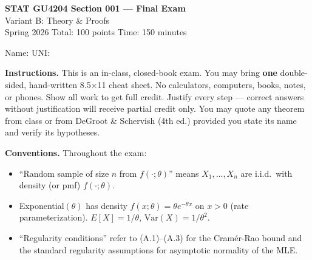 \documentclass[11pt]{article}
\begin{document}
\begin{center}
{\LARGE\bfseries STAT GU4204 Section 001 --- Final Exam}\\[4pt]
{\large Variant B: Theory \& Proofs}\\[6pt]
{\large Spring 2026 \hspace{1.5cm} Total: 100 points \hspace{1.5cm} Time: 150 minutes}\\[4pt]
\end{center}

\medskip

Name: \underline{\hspace{3in}} \hspace{1cm} UNI: \underline{\hspace{1.5in}}

\medskip

\textbf{Instructions.} This is an in-class, closed-book exam. You may bring \textbf{one} double-sided, hand-written 8.5$\times$11 cheat sheet. No calculators, computers, books, notes, or phones. Show all work to get full credit. Justify every step --- correct answers without justification will receive partial credit only. You may quote any theorem from class or from DeGroot \& Schervish (4th ed.) provided you state its name and verify its hypotheses.

\medskip

\textbf{Conventions.} Throughout the exam:
\begin{itemize}[leftmargin=2em,nosep]
    \item ``Random sample of size $n$ from $f(\cdot;\theta)$'' means $X_1,\ldots,X_n$ are i.i.d.\ with density (or pmf) $f(\cdot;\theta)$.
    \item Exponential$(\theta)$ has density $f(x;\theta) = \theta e^{-\theta x}$ on $x>0$ (rate parameterization). $E[X]=1/\theta$, $\mathrm{Var}(X)=1/\theta^2$.
    \item ``Regularity conditions'' refer to (A.1)--(A.3) for the Cram\'er-Rao bound and the standard regularity assumptions for asymptotic normality of the MLE.
\end{itemize}

\medskip
\end{document}
